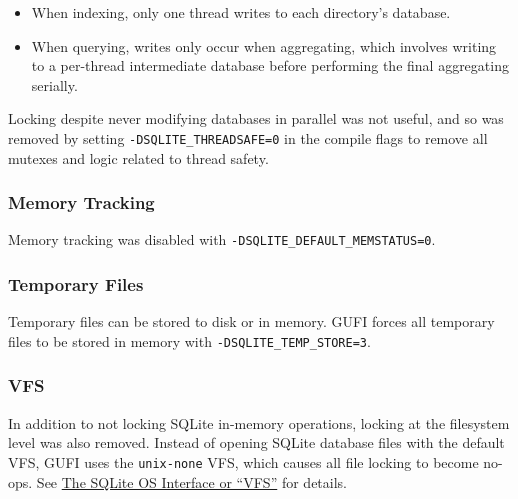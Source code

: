 \begin{itemize}
\item When indexing, only one thread writes to each directory's
  database.
\item When querying, writes only occur when aggregating, which
  involves writing to a per-thread intermediate database before
  performing the final aggregating serially.
\end{itemize}

Locking despite never modifying databases in parallel was not useful,
and so was removed by setting \texttt{-DSQLITE\_THREADSAFE=0} in the
compile flags to remove all mutexes and logic related to thread
safety.

\subsubsection{Memory Tracking}
Memory tracking was disabled with \texttt{-DSQLITE\_DEFAULT\_MEMSTATUS=0}.

\subsubsection{Temporary Files}
Temporary files can be stored to disk or in memory. GUFI forces all
temporary files to be stored in memory with
\texttt{-DSQLITE\_TEMP\_STORE=3}.

\subsubsection{VFS}
In addition to not locking SQLite in-memory operations, locking at the
filesystem level was also removed. Instead of opening SQLite database
files with the default VFS, GUFI uses the \texttt{unix-none} VFS,
which causes all file locking to become no-ops. See
\href{https://www.sqlite.org/vfs.html}{The SQLite OS Interface or
  ``VFS''} for
details.

